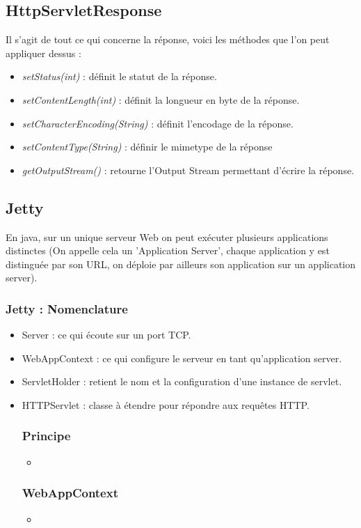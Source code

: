 \documentclass{article}[12pt]
\newcommand{\JavaScript}[2]{
	\begin{itemize}
		\item[]
	\end{itemize}
}
\begin{document}
\subsection{HttpServletResponse}
Il s'agit de tout ce qui concerne la réponse, voici les méthodes que l'on peut appliquer dessus :
\begin{itemize}
	\item \emph{setStatus(int)} : définit le statut de la réponse.
    \item \emph{setContentLength(int)} : définit la longueur en byte de la réponse.
    \item \emph{setCharacterEncoding(String)} : définit l'encodage de la réponse.
    \item \emph{setContentType(String)} : définir le mimetype de la réponse
    \item \emph{getOutputStream()} : retourne l'Output Stream permettant d'écrire la réponse.
\end{itemize}
\subsection{Jetty}
En java, sur un unique serveur Web on peut exécuter plusieurs applications distinctes (On appelle cela un 'Application Server', chaque application y est distinguée par son URL, on déploie par ailleurs son application sur un application server).
\subsubsection{Jetty : Nomenclature}
\begin{itemize}
	\item Server : ce qui écoute sur un port TCP.
    \item WebAppContext : ce qui configure le serveur en tant qu'application server.
    \item ServletHolder : retient le nom et la configuration d'une instance de servlet.
    \item HTTPServlet : classe à étendre pour répondre aux requêtes HTTP.
\subsubsection{Principe}
\JavaScript{principe_jetty}{Principe Jetty}
\subsubsection{WebAppContext}
\JavaScript{webappcontext}{Quelques méthodes du WebAppContext}
\end{itemize}
\end{document}
